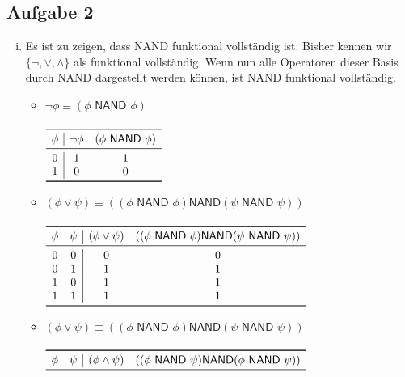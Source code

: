 \documentclass[a4paper,10pt]{article}
\begin{document}
\subsection*{Aufgabe 2}
\begin{enumerate}[(i)]
\item Es ist zu zeigen, dass \textsf{NAND} funktional vollständig ist. Bisher kennen wir $\{\lnot, \lor, \land\}$ als funktional vollständig. Wenn nun alle Operatoren dieser Basis durch \textsf{NAND} dargestellt werden können, ist \textsf{NAND} funktional vollständig.
\begin{itemize}
\item $\lnot\phi \equiv (\phi \textsf{ NAND } \phi)$ \\
\\
\begin{math}
\begin{array}{c|cc}
\toprule 
\phi & \lnot \phi & (\phi \textsf{ NAND } \phi) \\
\midrule
0 & 1 & 1 \\
1 & 0 & 0 \\
\bottomrule
\end{array}
\end{math}
\item $(\phi \lor \psi) \equiv ((\phi \textsf{ NAND } \phi) \textsf{NAND} (\psi \textsf{ NAND } \psi))$ \\
\\
\begin{math}
\begin{array}{cc|cc}
\toprule 
\phi & \psi & (\phi \lor  \psi) & ((\phi \textsf{ NAND } \phi) \textsf{NAND} (\psi \textsf{ NAND } \psi)) \\
\midrule
0 & 0 & 0 & 0 \\
0 & 1 & 1 & 1 \\
1 & 0 & 1 & 1 \\
1 & 1 & 1 & 1 \\
\bottomrule
\end{array}
\end{math}
\item $(\phi \lor \psi) \equiv ((\phi \textsf{ NAND } \phi) \textsf{NAND} (\psi \textsf{ NAND } \psi))$ \\
\\
\begin{math}
\begin{array}{cc|cc}
\toprule 
\phi & \psi & (\phi \land  \psi) & ((\phi \textsf{ NAND } \psi) \textsf{NAND} (\phi \textsf{ NAND } \psi)) \\
\midrule

\end{array}
\end{math}
\end{itemize}
\end{enumerate}
\end{document}
